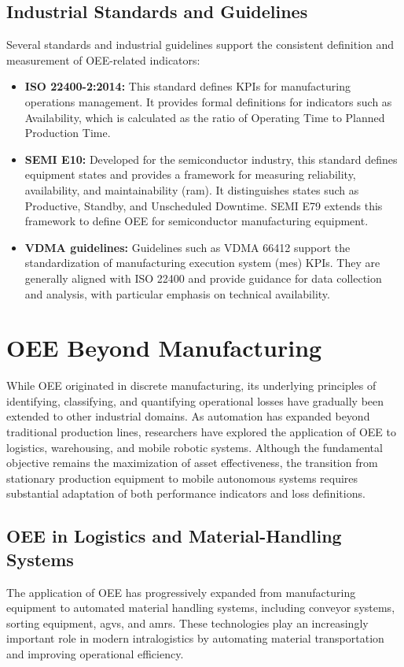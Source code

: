 \subsection{Industrial Standards and Guidelines}
Several standards and industrial guidelines support the consistent definition and measurement of OEE-related indicators:
\begin{itemize}
  \item \textbf{ISO 22400-2:2014:} This standard defines KPIs for manufacturing operations management. It provides formal definitions for indicators such as Availability, which is calculated as the ratio of Operating Time to Planned Production Time.\cite{iso22400_2_2014}

  \item \textbf{SEMI E10:} Developed for the semiconductor industry, this standard defines equipment states and provides a framework for measuring reliability, availability, and maintainability (\gls{ram}). It distinguishes states such as Productive, Standby, and Unscheduled Downtime.\cite{semi_e10_ram} SEMI E79 extends this framework to define OEE for semiconductor manufacturing equipment.

  \item \textbf{VDMA guidelines:} Guidelines such as VDMA 66412 support the standardization of manufacturing execution system (\gls{mes}) KPIs. They are generally aligned with ISO 22400 and provide guidance for data collection and analysis, with particular emphasis on technical availability.
\end{itemize}
\section{OEE Beyond Manufacturing}
While OEE originated in discrete manufacturing, its underlying principles of identifying, classifying, and quantifying operational losses have gradually been extended to other industrial domains. As automation has expanded beyond traditional production lines, researchers have explored the application of OEE to logistics, warehousing, and mobile robotic systems. Although the fundamental objective remains the maximization of asset effectiveness, the transition from stationary production equipment to mobile autonomous systems requires substantial adaptation of both performance indicators and loss definitions.
\subsection{OEE in Logistics and Material-Handling Systems}
The application of OEE has progressively expanded from manufacturing equipment to automated material handling systems, including conveyor systems, sorting equipment, \glspl{agv}, and \glspl{amr}. These technologies play an increasingly important role in modern intralogistics by automating material transportation and improving operational efficiency.


